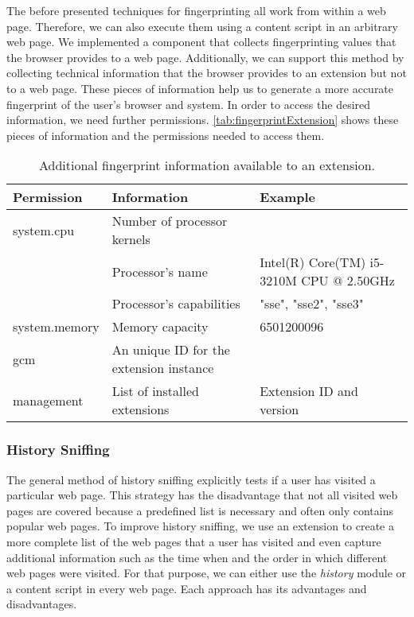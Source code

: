 	The before presented techniques for fingerprinting all work from within a web page. Therefore, we can also execute them using a content script in an arbitrary web page. We implemented a component that collects fingerprinting values that the browser provides to a web page. Additionally, we can support this method by collecting technical information that the browser provides to an extension but not to a web page. These pieces of information help us to generate a more accurate fingerprint of the user's browser and system. In order to access the desired information, we need further permissions. \autoref{tab:fingerprintExtension} shows these pieces of information and the permissions needed to access them. 
	
	\begin{table}[h]
		\begin{tabular}{|l|l|l|} \hline
			\textbf{Permission} & \textbf{Information} & \textbf{Example} \\ \hline
			system.cpu & Number of processor kernels & \\
			& Processor's name & Intel(R) Core(TM) i5-3210M CPU @ 2.50GHz \\
			& Processor's capabilities & "sse", "sse2", "sse3"  \\ \hline
			system.memory & Memory capacity & 6501200096 \\ \hline
			gcm & An unique ID for the extension instance & \\ \hline
			management & List of installed extensions & Extension ID and version \\ \hline
		\end{tabular}
		\caption{Additional fingerprint information available to an extension.}
		\label{tab:fingerprintExtension}
	\end{table} 
	
\subsubsection{History Sniffing}
\label{sec:historySniffing}

	The general method of history sniffing explicitly tests if a user has visited a particular web page. This strategy has the disadvantage that not all visited web pages are covered because a predefined list is necessary and often only contains popular web pages. To improve history sniffing, we use an extension to create a more complete list of the web pages that a user has visited and even capture additional information such as the time when and the order in which different web pages were visited. For that purpose, we can either use the \textit{history} module or a content script in every web page. Each approach has its advantages and disadvantages. 
	
